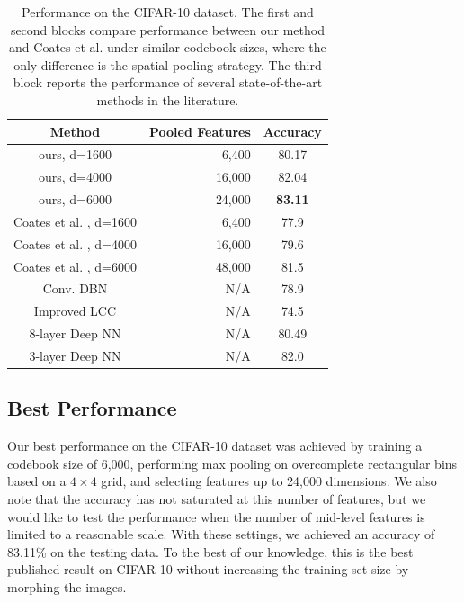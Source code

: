 \begin{table}
  \begin{minipage}[c]{1\linewidth}
  \begin{center}
  \begin{tabular}{c|r|c}
    \hline
    Method & Pooled Features & Accuracy \\
    \hline
    ours, d=1600 & 6,400 & 80.17 \\
    ours, d=4000 & 16,000 & 82.04 \\
    ours, d=6000 & 24,000 & {\bfseries 83.11}\\
    \hline
    Coates et al. \cite{coates2010aistats}, d=1600 & 6,400 & 77.9\phantom{0} \\
    Coates et al. \cite{coates2010aistats}, d=4000 & 16,000 & 79.6\phantom{0} \\
    Coates et al. \cite{coates2011icml}, d=6000 & 48,000 & 81.5\phantom{0}\\
    \hline
    Conv. DBN \cite{Krizhevsky2010} & N/A & 78.9\phantom{0} \\
    Improved LCC \cite{Yu:2010wu} & N/A & 74.5\phantom{0} \\
    8-layer Deep NN \cite{2011arXiv1102.0183C} & N/A & 80.49 \\
    3-layer Deep NN \cite{coates2011selecting} & N/A & 82.0\phantom{0} \\
    \hline
  \end{tabular}
  \end{center}
  \end{minipage}
  \caption{Performance on the CIFAR-10 dataset. The first and second blocks compare performance between our method and Coates et al. \cite{coates2010aistats,coates2011icml} under similar codebook sizes, where the only difference is the spatial pooling strategy. The third block reports the performance of several state-of-the-art methods in the literature.}\label{table:cifar10}
\end{table}

\subsection{Best Performance}
Our best performance on the CIFAR-10 dataset was achieved by training a codebook size of 6,000, performing max pooling on overcomplete rectangular bins based on a $4\times4$ grid, and selecting features up to 24,000 dimensions. We also note that the accuracy has not saturated at this number of features, but we would like to test the performance when the number of mid-level features is limited to a reasonable scale. With these settings, we achieved an accuracy of 83.11\% on the testing data. To the best of our knowledge, this is the best published result on CIFAR-10 without increasing the training set size by morphing the images. 

